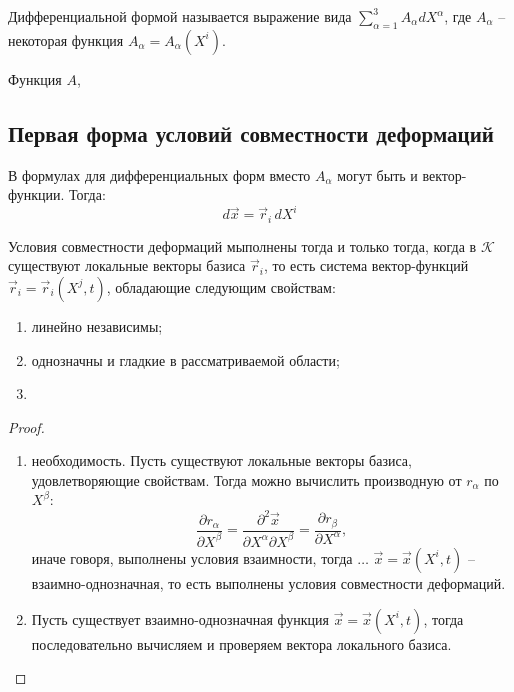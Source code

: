 \begin{definition}
  Дифференциальной формой называется выражение вида $\sum_{\alpha=1}^3 A_\alpha dX^\alpha$,
  где $A_\alpha$ -- некоторая функция $A_\alpha = A_\alpha(X^i)$.
\end{definition}

\begin{theorem}
  Функция $A$, 
\end{theorem}


\subsection{Первая форма условий совместности деформаций}

В формулах для дифференциальных форм вместо $A_\alpha$ могут быть и вектор-функции.
Тогда:
\[
  d\vec{x} = \vec{r}_i \, dX^i
\]

\begin{utv}
  Условия совместности деформаций мыполнены тогда и только тогда, когда в $\mathcal{K}$
  существуют локальные векторы базиса $\vec{r}_i$, то есть система вектор-функций
  $\vec{r}_i = \vec{r}_i(X^j, t)$, обладающие следующим свойствам:
  \begin{enumerate}
    \item линейно независимы;
    \item однозначны и гладкие в рассматриваемой области;
    \item 
  \end{enumerate}
\end{utv}
\begin{proof}
  \begin{enumerate}
    \item необходимость. Пусть существуют локальные векторы базиса, удовлетворяющие свойствам.
      Тогда можно вычислить производную от $r_\alpha$ по $X^\beta$:
      \[
        \dfrac{\partial r_\alpha}{\partial X^\beta} = \dfrac{\partial^2 \vec{x}}{\partial X^\alpha \partial X^\beta} = \dfrac{\partial r_\beta}{\partial X^\alpha},
      \]
      иначе говоря, выполнены условия взаимности, тогда $\dots$ $\vec{x} = \vec{x}(X^i, t)$ --
      взаимно-однозначная, то есть выполнены условия совместности деформаций.

    \item Пусть существует взаимно-однозначная функция $\vec{x} = \vec{x}(X^i, t)$,
      тогда последовательно вычисляем и проверяем вектора локального базиса.
  \end{enumerate}
\end{proof}

